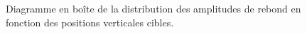 \begin{figure} [h]
	\caption[Diagramme en boîte de la distribution des amplitudes de rebond en fonction des positions verticales cibles]{Diagramme en boîte de la distribution des amplitudes de rebond en fonction des positions verticales cibles.}
	\label{fig_target_height_significance}
\end{figure} 